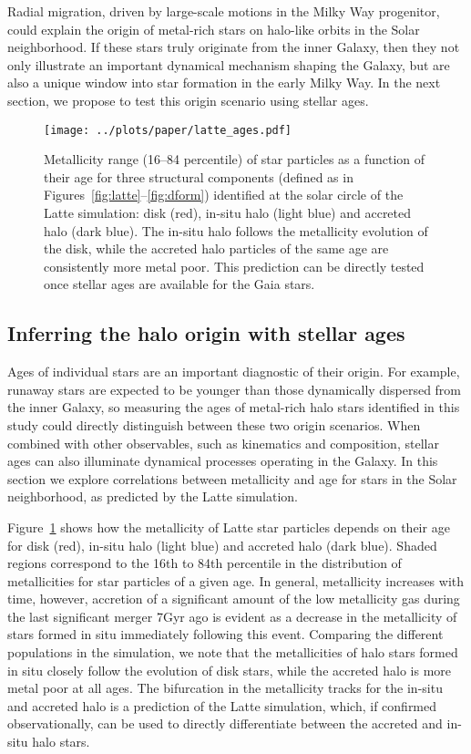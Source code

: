 \documentclass[apj, twocolappendix, numberedappendix, appendixfloats]{emulateapj}
\begin{document}
Radial migration, driven by large-scale motions in the Milky Way progenitor, could explain the origin of metal-rich stars on halo-like orbits in the Solar neighborhood.
If these stars truly originate from the inner Galaxy, then they not only illustrate an important dynamical mechanism shaping the Galaxy, but are also a unique window into star formation in the early Milky Way.
In the next section, we propose to test this origin scenario using stellar ages.


\begin{figure}
\begin{center}
\texttt{[image: ../plots/paper/latte\_ages.pdf]}
\caption{Metallicity range (16--84 percentile) of star particles as a function of their age for three structural components (defined as in Figures~\ref{fig:latte}--\ref{fig:dform}) identified at the solar circle of the Latte simulation: disk (red), in-situ halo (light blue) and accreted halo (dark blue).
The in-situ halo follows the metallicity evolution of the disk, while the accreted halo particles of the same age are consistently more metal poor.
This prediction can be directly tested once stellar ages are available for the Gaia stars.}
\label{fig:ages}
\end{center}
\end{figure}

\subsection{Inferring the halo origin with stellar ages}
\label{sec:ages}
Ages of individual stars are an important diagnostic of their origin.
For example, runaway stars are expected to be younger than those dynamically dispersed from the inner Galaxy, so measuring the ages of metal-rich halo stars identified in this study could directly distinguish between these two origin scenarios.
When combined with other observables, such as kinematics and composition, stellar ages can also illuminate dynamical processes operating in the Galaxy.
In this section we explore correlations between metallicity and age for stars in the Solar neighborhood, as predicted by the Latte simulation.

Figure~\ref{fig:ages} shows how the metallicity of Latte star particles depends on their age for disk (red), in-situ halo (light blue) and accreted halo (dark blue).
Shaded regions correspond to the 16th to 84th percentile in the distribution of metallicities for star particles of a given age.
In general, metallicity increases with time, however, accretion of a significant amount of the low metallicity gas during the last significant merger 7\;Gyr ago is evident as a decrease in the metallicity of stars formed in situ immediately following this event.
Comparing the different populations in the simulation, we note that the metallicities of halo stars formed in situ closely follow the evolution of disk stars, while the accreted halo is more metal poor at all ages.
The bifurcation in the metallicity tracks for the in-situ and accreted halo is a prediction of the Latte simulation, which, if confirmed observationally, can be used to directly differentiate between the accreted and in-situ halo stars.
\end{document}
